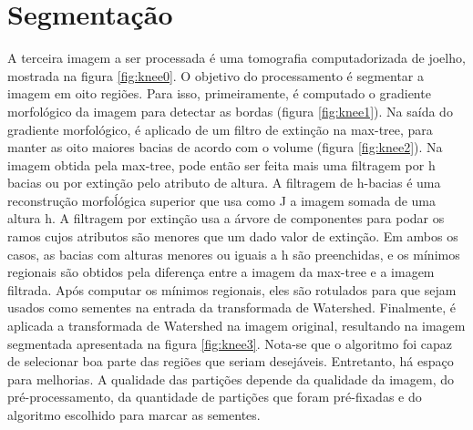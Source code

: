 \documentclass{article}
\begin{document}
\section{Segmentação}
A terceira imagem a ser processada é uma tomografia computadorizada de joelho, mostrada na figura \ref{fig:knee0}. O objetivo do processamento é segmentar a imagem em oito regiões. Para isso, primeiramente, é computado o gradiente morfológico da imagem para detectar as bordas (figura \ref{fig:knee1}). Na saída do gradiente morfológico, é aplicado de um filtro de extinção na max-tree, para manter as oito maiores bacias de acordo com o volume (figura \ref{fig:knee2}). Na imagem obtida pela max-tree, pode então ser feita mais uma filtragem por h bacias ou por extinção pelo atributo de altura. A filtragem de h-bacias é uma reconstrução morfoĺógica superior que usa como J a imagem somada de uma altura h. A filtragem por extinção usa a árvore de componentes para podar os ramos cujos atributos são menores que um dado valor de extinção. Em ambos os casos, as bacias com alturas menores ou iguais a h são preenchidas, e os mínimos regionais são obtidos pela diferença entre a imagem da max-tree e a imagem filtrada. Após computar os mínimos regionais, eles são rotulados para que sejam usados como sementes na entrada da transformada de Watershed. Finalmente, é aplicada a transformada de Watershed na imagem original, resultando na imagem segmentada apresentada na figura \ref{fig:knee3}. Nota-se que o algoritmo foi capaz de selecionar boa parte das regiões que seriam desejáveis. Entretanto, há espaço para melhorias. A qualidade das partições depende da qualidade da imagem, do pré-processamento, da quantidade de partições que foram pré-fixadas e do algoritmo escolhido para marcar as sementes.
\end{document}
